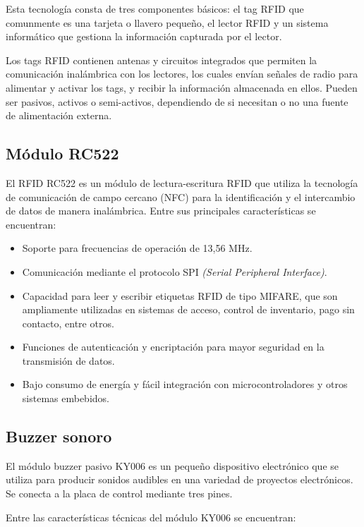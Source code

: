 Esta tecnología consta de tres componentes básicos: el tag RFID que comunmente es una tarjeta o llavero pequeño, el lector RFID y un sistema informático que gestiona la información capturada por el lector. 

Los tags RFID contienen antenas y circuitos integrados que permiten la comunicación inalámbrica con los lectores, los cuales envían señales de radio para alimentar y activar los tags, y recibir la información almacenada en ellos. Pueden ser pasivos, activos o semi-activos, dependiendo de si necesitan o no una fuente de alimentación externa. 


\subsection{Módulo RC522}
\label{subsec:rc522}


El RFID RC522 \cite{MFRC522} es un módulo de lectura-escritura RFID que utiliza la tecnología de comunicación de campo cercano (NFC) para la identificación y el intercambio de datos de manera inalámbrica. Entre sus principales características se encuentran:

\begin{itemize}
\item Soporte para frecuencias de operación de 13,56 MHz.
\item Comunicación mediante el protocolo SPI \textit{(Serial Peripheral Interface)}.
\item Capacidad para leer y escribir etiquetas RFID de tipo MIFARE, que son ampliamente utilizadas en sistemas de acceso, control de inventario, pago sin contacto, entre otros.
\item Funciones de autenticación y encriptación para mayor seguridad en la transmisión de datos.
\item Bajo consumo de energía y fácil integración con microcontroladores y otros sistemas embebidos.
\end{itemize}

\subsection{Buzzer sonoro}
\label{subsec:buzzer}

El módulo buzzer pasivo KY006 \cite{BUZZER} es un pequeño dispositivo electrónico que se utiliza para producir sonidos audibles en una variedad de proyectos electrónicos. Se conecta a la placa de control mediante tres pines.

Entre las características técnicas del módulo KY006 se encuentran:

